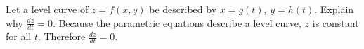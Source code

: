 {Let a level curve of $z=f(x,y)$ be described by $x=g(t)$, $y = h(t)$. Explain why $\frac{dz}{dt}=0$.
}
{Because the parametric equations describe a level curve, $z$ is constant for all $t$. Therefore $\frac{dz}{dt}=0$.
}
